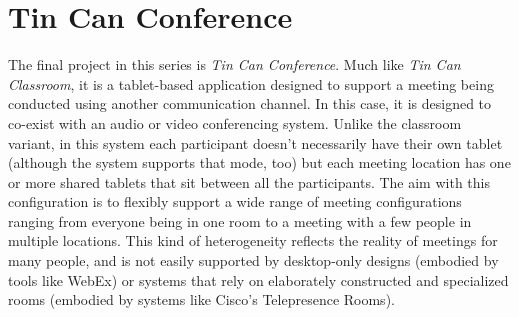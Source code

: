\documentclass{tufte-handout}
\begin{document}
% 


\section{Tin Can Conference}

The final project in this series is \emph{Tin Can Conference}. Much like \emph{Tin Can Classroom}, it is a tablet-based application designed to support a meeting being conducted using another communication channel. In this case, it is designed to co-exist with an audio or video conferencing system. Unlike the classroom variant, in this system each participant doesn't necessarily have their own tablet (although the system supports that mode, too) but each meeting location has one or more shared tablets that sit between all the participants. The aim with this configuration is to flexibly support a wide range of meeting configurations ranging from everyone being in one room to a meeting with a few people in multiple locations. This kind of heterogeneity reflects the reality of meetings for many people, and is not easily supported by desktop-only designs (embodied by tools like WebEx) or systems that rely on elaborately constructed and specialized rooms (embodied by systems like Cisco's Telepresence Rooms).
\end{document}
